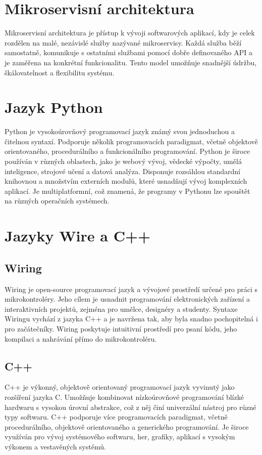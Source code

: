 \section{Mikroservisní architektura}\label{sec:microservice-architecture}
Mikroservisní architektura je přístup k vývoji softwarových aplikací, kdy je celek rozdělen na malé, nezávislé služby nazývané mikroservisy.
Každá služba běží samostatně, komunikuje s ostatními službami pomocí dobře definovaného API a je zaměřena na konkrétní funkcionalitu.
Tento model umožňuje snadnější údržbu, škálovatelnost a flexibilitu systému.


\section{Jazyk Python}\label{sec:python}
Python je vysokoúrovňový programovací jazyk známý svou jednoduchou a čitelnou syntaxí.
Podporuje několik programovacích paradigmat, včetně objektově orientovaného, procedurálního a funkcionálního programování.
Python je široce používán v různých oblastech, jako je webový vývoj, vědecké výpočty, umělá inteligence, strojové učení a datová analýza.
Disponuje rozsáhlou standardní knihovnou a množstvím externích modulů, které usnadňují vývoj komplexních aplikací.
Je multiplatformní, což znamená, že programy v Pythonu lze spouštět na různých operačních systémech.


\section{Jazyky Wire a C++ }

\subsection{Wiring}\label{sec:wiring}
Wiring je open-source programovací jazyk a vývojové prostředí určené pro práci s mikrokontroléry.
Jeho cílem je usnadnit programování elektronických zařízení a interaktivních projektů, zejména pro umělce, designéry a studenty.
Syntaxe Wiringu vychází z jazyka C++ a je navržena tak, aby byla snadno pochopitelná i pro začátečníky.
Wiring poskytuje intuitivní prostředí pro psaní kódu, jeho kompilaci a nahrávání přímo do mikrokontroléru.

\subsection{C++}\label{sec:cpp}
C++ je výkonný, objektově orientovaný programovací jazyk vyvinutý jako rozšíření jazyka C.
Umožňuje kombinovat nízkoúrovňové programování blízké hardwaru s vysokou úrovní abstrakce, což z něj činí univerzální nástroj pro různé typy softwaru.
C++ podporuje více programovacích paradigmat, včetně procedurálního, objektově orientovaného a generického programování.
Je široce využíván pro vývoj systémového softwaru, her, grafiky, aplikací s vysokým výkonem a vestavěných systémů.


